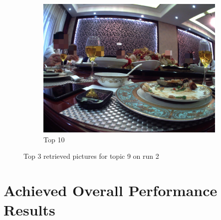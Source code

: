\begin{figure}[H]
\begin{subfigure}{0.32\textwidth}
        \includegraphics[width=\textwidth]{Sections/7Results/images/run2top10.jpg}\hfill
        \caption{Top 10}
      \end{subfigure}
    \caption{Top 3 retrieved pictures for topic 9 on run 2}
    \label{fig:run2}
  \end{figure}





  \newpage

 
\newpage

\section{Achieved Overall Performance Results}
\label{sec:perfomance_results}

